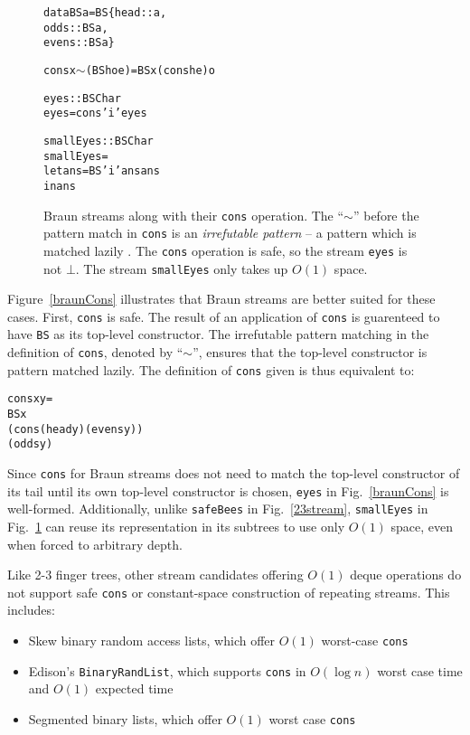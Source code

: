 \documentclass[envcountsect]{llncs}
\begin{document}
\begin{figure}
\begin{alltt}
data BS a = BS \{head::a, 
                odds::BS a, 
                evens::BS a\}

cons x \(\sim\)(BS h o e) = BS x (cons h e) o

eyes :: BS Char
eyes = cons 'i' eyes

smallEyes :: BS Char
smallEyes = 
  let ans = BS 'i' ans ans 
  in ans
\end{alltt}
\caption{
Braun streams along with their {\tt cons} operation.
The ``$\sim$'' before the pattern match in {\tt cons} is an {\em irrefutable pattern} -- a pattern which is matched lazily \cite{haskellReport}.
The {\tt cons} operation is safe, so the stream {\tt eyes} is not $\bot$.
The stream {\tt smallEyes} only takes up $O(1)$ space.
}
\label{braunDef}
\label{braunCons}
\label{braunShare}
\end{figure}

Figure~\ref{braunCons} illustrates that Braun streams are better suited for these cases.
First, {\tt cons} is safe.
The result of an application of {\tt cons} is guarenteed to have {\tt BS} as its top-level constructor.
The irrefutable pattern matching in the definition of {\tt cons}, denoted by ``$\sim$'', ensures that the top-level constructor is pattern matched lazily.
The definition of {\tt cons} given is thus equivalent to:

\begin{alltt}
cons x y =
  BS x
     (cons (head y) (evens y))
     (odds y)
\end{alltt}

Since {\tt cons} for Braun streams does not need to match the top-level constructor of its tail until its own top-level constructor is chosen, {\tt eyes} in Fig.~\ref{braunCons} is well-formed.
Additionally, unlike {\tt safeBees} in Fig.~\ref{23stream}, {\tt smallEyes} in Fig.~\ref{braunShare} can reuse its representation in its subtrees to use only $O(1)$ space, even when forced to arbitrary depth.

Like 2-3 finger trees, other stream candidates offering $O(1)$ deque operations do not support safe {\tt cons} or constant-space construction of repeating streams. This includes:

\begin{itemize}
\item Skew binary random access lists, which offer $O(1)$ worst-case {\tt cons} \cite{okasakiSkewLists}
\item Edison's \verb|BinaryRandList|, which supports {\tt cons} in $O(\log n)$ worst case time and $O(1)$ expected time \cite{edison,holtersThesis}
\item Segmented binary lists, which offer $O(1)$ worst case {\tt cons} \cite{okasakiThesis}
\end{itemize}
\end{document}
